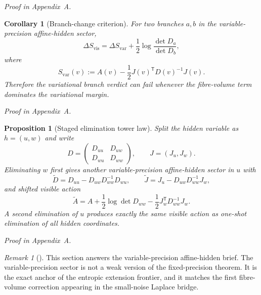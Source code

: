 \documentclass[11pt,a4paper]{article}
\numberwithin{equation}{section}
\theoremstyle{thmcompact}
\newtheorem{proposition}[theorem]{Proposition}
\newtheorem{corollary}[theorem]{Corollary}
\theoremstyle{remark}
\newtheorem*{remarkplain}{Remark}
\newenvironment{remark}[1][]%
{\begin{remarkbox}\begin{remarkplain}[#1]\normalfont}
{\end{remarkplain}\end{remarkbox}}
\newcommand{\proofappendix}{\par{\hfill\scriptsize\emph{Proof in Appendix~A.}}\par}
\begin{document}
\proofappendix

\begin{corollary}[Branch-change criterion]
\label{cor:entropic-branch-change}
For two branches $a,b$ in the variable-precision affine-hidden sector,
\begin{equation}
\Delta S_{\mathrm{vis}}
=
\Delta S_{\mathrm{var}}
+\frac12\log\frac{\det D_a}{\det D_b},
\end{equation}
where
\begin{equation}
S_{\mathrm{var}}(v):=A(v)-\frac12J(v)^{\mathsf T}D(v)^{-1}J(v).
\end{equation}
Therefore the variational branch verdict can fail whenever the fibre-volume term dominates the variational margin.
\end{corollary}

\proofappendix

\begin{proposition}[Staged elimination tower law]
\label{prop:variable-precision-tower}
Split the hidden variable as $h=(u,w)$ and write
\begin{equation}
D=
\begin{pmatrix}
D_{uu} & D_{uw}\\
D_{wu} & D_{ww}
\end{pmatrix},
\qquad
J=(J_u,J_w).
\end{equation}
Eliminating $w$ first gives another variable-precision affine-hidden sector in $u$ with
\begin{equation}
\widetilde D=D_{uu}-D_{uw}D_{ww}^{-1}D_{wu},
\qquad
\widetilde J=J_u-D_{uw}D_{ww}^{-1}J_w,
\end{equation}
and shifted visible action
\begin{equation}
\widetilde A
=
A+\frac12\log\det D_{ww}-\frac12J_w^{\mathsf T}D_{ww}^{-1}J_w.
\end{equation}
A second elimination of $u$ produces exactly the same visible action as one-shot elimination of all hidden coordinates.
\end{proposition}

\proofappendix

\begin{remark}
This section answers the variable-precision affine-hidden brief. The variable-precision sector is not a weak version of the fixed-precision theorem. It is the exact anchor of the entropic extension frontier, and it matches the first fibre-volume correction appearing in the small-noise Laplace bridge.
\end{remark}
\end{document}
